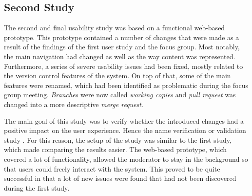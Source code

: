 
\subsection{Second Study}
The second and final usability study was based on a functional web-based prototype. This prototype contained a number of changes that were made as a result of the findings of the first user study and the focus group. Most notably, the main navigation had changed as well as the way content was represented. Furthermore, a series of severe usability issues had been fixed, mostly related to the version control features of the system. On top of that, some of the main features were renamed, which had been identified as problematic during the focus group meeting. \textit{Branches} were now called \textit{working copies} and \textit{pull request} was changed into a more descriptive \textit{merge request}.

The main goal of this study was to verify whether the introduced changes had a positive impact on the user experience. Hence the name verification or validation study \cite{goodman_observing_2012} \cite{rubin_handbook_2008}.
For this reason, the setup of the study was similar to the first study, which made comparing the results easier. The web-based prototype, which covered a lot of functionality, allowed the moderator to stay in the background so that users could freely interact with the system. This proved to be quite successful in that a lot of new issues were found that had not been discovered during the first study.

